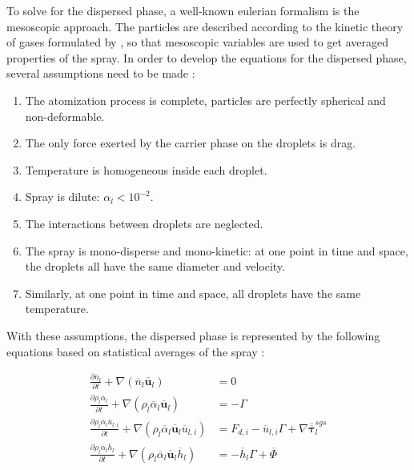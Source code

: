 To solve for the dispersed phase, a well-known eulerian formalism is the mesoscopic approach. The particles are described according to the kinetic theory of gases formulated by , so that mesoscopic variables are used to get averaged properties of the spray. In order to develop the equations for the dispersed phase, several assumptions need to be made :

\begin{enumerate}

\item The atomization process is complete, particles are perfectly spherical and non-deformable.

\item The only force exerted by the carrier phase on the droplets is drag.

\item Temperature is homogeneous inside each droplet.

\item Spray is dilute: $\alpha_l < 10^{-2}$.

\item The interactions between droplets are neglected.

\item The spray is mono-disperse and mono-kinetic: at one point in time and space, the droplets all have the same diameter and velocity.

\item Similarly, at one point in time and space, all droplets have the same temperature.


\end{enumerate}

With these assumptions, the dispersed phase is represented by the following equations based on statistical averages of the spray :

\begin{subequations}
\label{eq:EE_disperse_phase}
\begin{align}
\frac{\partial \overline{n}_l}{\partial t} + \nabla \left( \overline{n}_l \overline{\textbf{u}}_l \right)  &= 0 \\
\frac{\partial \rho_l \overline{\alpha}_l}{\partial t} + \nabla \left( \rho_l \overline{\alpha}_l \overline{\textbf{u}}_l \right) &= - \Gamma \\
\frac{\partial \rho_l \overline{\alpha}_l \overline{u}_{l,i}}{\partial t} + \nabla \left( \rho_l \overline{\alpha}_l \overline{\textbf{u}}_l \overline{u}_{l,i} \right) &= F_{d,i} - \overline{u}_{l,i} \Gamma  + \nabla \overline{\overline{\pmb{\tau}}}_l^{sgs} \\
\frac{\partial \rho_l \overline{\alpha}_l \overline{h}_l}{\partial t} + \nabla \left( \rho_l \overline{\alpha}_l \overline{\textbf{u}}_l  \overline{h}_l \right) &=  - \overline{h}_l  \Gamma + \overline{\Phi}
\end{align}
\end{subequations}

